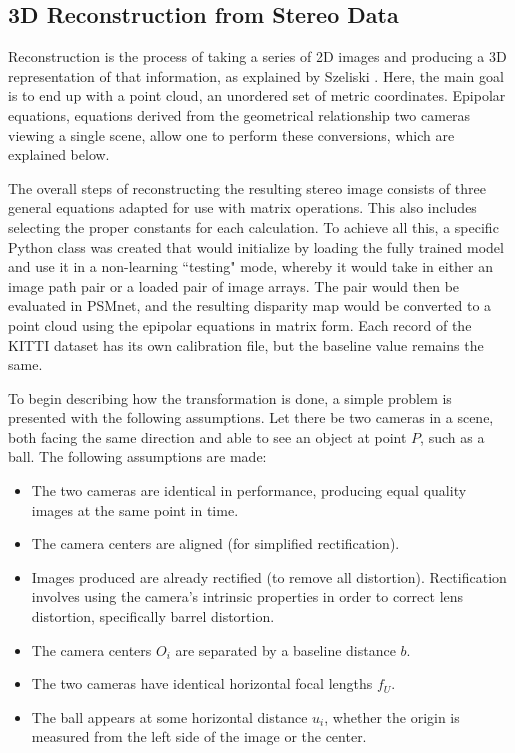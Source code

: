 \subsection{3D Reconstruction from Stereo Data}
\label{sect_reconstruct}
Reconstruction is the process of taking a series of 2D images and producing a 3D representation of that information, as explained by Szeliski \cite{szeliski_computer_2010}. Here, the main goal is to end up with a point cloud, an unordered set of metric coordinates. Epipolar equations, equations derived from the geometrical relationship two cameras viewing a single scene, allow one to perform these conversions, which are explained below.

The overall steps of reconstructing the resulting stereo image consists of three general equations adapted for use with matrix operations\cite{szeliski_computer_2010, wang_pseudo-lidar_2019}. This also includes selecting the proper constants for each calculation. To achieve all this, a specific Python class was created that would initialize by loading the fully trained model and use it in a non-learning ``testing" mode, whereby it would take in either an image path pair or a loaded pair of image arrays. The pair would then be evaluated in PSMnet, and the resulting disparity map would be converted to a point cloud using the epipolar equations in matrix form. Each record of the KITTI dataset has its own calibration file, but the baseline value remains the same.

To begin describing how the transformation is done, a simple problem is presented with the following assumptions. Let there be two cameras in a scene, both facing the same direction and able to see an object at point $P$, such as a ball. The following assumptions are made: 

\begin{itemize} \itemsep=-0.5em
	\item The two cameras are identical in performance, producing equal quality images at the same point in time.
	\item The camera centers are aligned (for simplified rectification).
	\item Images produced are already rectified (to remove all distortion). Rectification involves using the camera's intrinsic properties in order to correct lens distortion, specifically barrel distortion.
	\item The camera centers $O_i$ are separated by a baseline distance $b$.
	\item The two cameras have identical horizontal focal lengths $f_U$.
	\item The ball appears at some horizontal distance $u_i$, whether the origin is measured from the left side of the image or the center.
\end{itemize}

